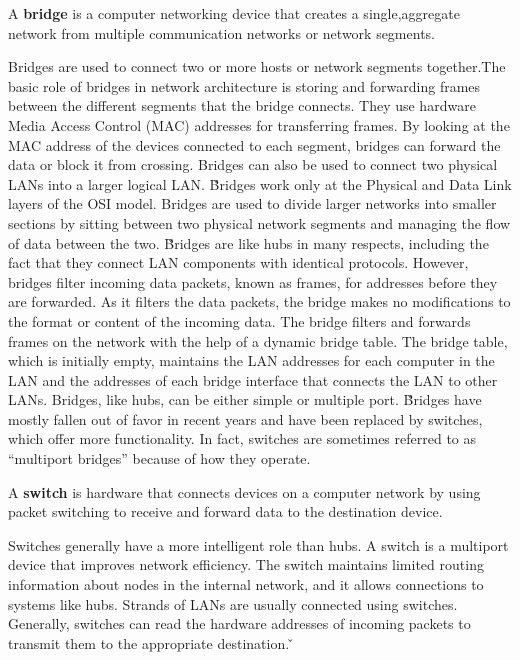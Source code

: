 \bd[Bridge]
A \textbf{bridge} is a computer networking device that creates a single,aggregate network from multiple communication
networks or network segments.
\ed


Bridges are used to connect two or more hosts or network segments together.The basic role of bridges in network
architecture is storing and forwarding frames between the different segments that the bridge connects. They use
hardware Media Access Control (MAC) addresses for transferring frames. By looking at the MAC address of the devices
connected to each segment, bridges can forward the data or block it from crossing. Bridges can also be used to
connect two physical LANs into a larger logical LAN. \v

Bridges work only at the Physical and Data Link layers of the OSI model. Bridges are used to divide larger networks
into smaller sections by sitting between two physical network segments and managing the flow of data between the two. \v

Bridges are like hubs in many respects, including the fact that they connect LAN components with identical protocols.
However, bridges filter incoming data packets, known as frames, for addresses before they are forwarded. As it
filters the data packets, the bridge makes no modifications to the format or content of the incoming data. The bridge
filters and forwards frames on the network with the help of a dynamic bridge table. The bridge table, which is
initially empty, maintains the LAN addresses for each computer in the LAN and the addresses of each bridge interface
that connects the LAN to other LANs. Bridges, like hubs, can be either simple or multiple port. \v

Bridges have mostly fallen out of favor in recent years and have been replaced by switches, which offer more
functionality. In fact, switches are sometimes referred to as ``multiport bridges'' because of how they operate.

\bd[Switch]
A \textbf{switch} is hardware that connects devices on a computer network by using packet switching to receive and
forward data to the destination device.
\ed


Switches generally have a more intelligent role than hubs. A switch is a multiport device that improves network
efficiency. The switch maintains limited routing information about nodes in the internal network, and it allows
connections to systems like hubs. Strands of LANs are usually connected using switches. Generally, switches can read
the hardware addresses of incoming packets to transmit them to the appropriate destination. \v

